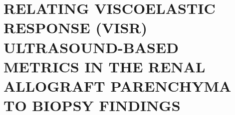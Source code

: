 
\chapter{RELATING VISCOELASTIC RESPONSE (VISR) ULTRASOUND-BASED METRICS IN THE RENAL ALLOGRAFT PARENCHYMA TO BIOPSY FINDINGS}
\label{chap:visr}







